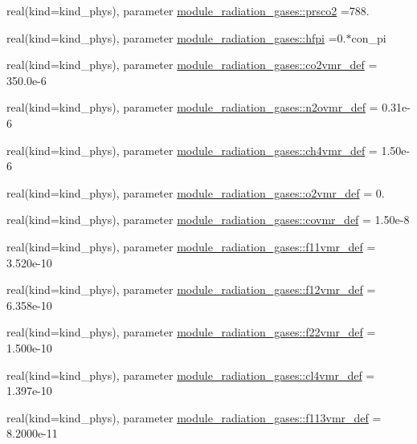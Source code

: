 \begin{DoxyCompactItemize}
\item 
real(kind=kind\+\_\+phys), parameter \hyperlink{namespacemodule__radiation__gases_ab09dc05b8a02e9a0b56991508b599708}{module\+\_\+radiation\+\_\+gases\+::prsco2} =788.
\item 
real(kind=kind\+\_\+phys), parameter \hyperlink{namespacemodule__radiation__gases_ab99c75954c59ed92a52de94ca6113f73}{module\+\_\+radiation\+\_\+gases\+::hfpi} =0.$\ast$con\+\_\+pi
\item 
real(kind=kind\+\_\+phys), parameter \hyperlink{namespacemodule__radiation__gases_a4fb5ca2e3bfaed7848d7602a22499e76}{module\+\_\+radiation\+\_\+gases\+::co2vmr\+\_\+def} = 350.\+0e-\/6
\item 
real(kind=kind\+\_\+phys), parameter \hyperlink{namespacemodule__radiation__gases_a858ad802efe755f8b4b5bde85996b6ae}{module\+\_\+radiation\+\_\+gases\+::n2ovmr\+\_\+def} = 0.\+31e-\/6
\item 
real(kind=kind\+\_\+phys), parameter \hyperlink{namespacemodule__radiation__gases_aad928d9e0064905a0b6e1eb8bb59bd23}{module\+\_\+radiation\+\_\+gases\+::ch4vmr\+\_\+def} = 1.\+50e-\/6
\item 
real(kind=kind\+\_\+phys), parameter \hyperlink{namespacemodule__radiation__gases_a910898e96b8afe92ebc82ce62ba682d8}{module\+\_\+radiation\+\_\+gases\+::o2vmr\+\_\+def} = 0.
\item 
real(kind=kind\+\_\+phys), parameter \hyperlink{namespacemodule__radiation__gases_a3554bdf03f8222d425bb6c946244cbb5}{module\+\_\+radiation\+\_\+gases\+::covmr\+\_\+def} = 1.\+50e-\/8
\item 
real(kind=kind\+\_\+phys), parameter \hyperlink{namespacemodule__radiation__gases_a23ae6bb6860bfefef0c281b7106f521e}{module\+\_\+radiation\+\_\+gases\+::f11vmr\+\_\+def} = 3.\+520e-\/10
\item 
real(kind=kind\+\_\+phys), parameter \hyperlink{namespacemodule__radiation__gases_a96d4f78070f30010626e0824b3421250}{module\+\_\+radiation\+\_\+gases\+::f12vmr\+\_\+def} = 6.\+358e-\/10
\item 
real(kind=kind\+\_\+phys), parameter \hyperlink{namespacemodule__radiation__gases_afd0018e96811ac64ef2abd8cab821eb5}{module\+\_\+radiation\+\_\+gases\+::f22vmr\+\_\+def} = 1.\+500e-\/10
\item 
real(kind=kind\+\_\+phys), parameter \hyperlink{namespacemodule__radiation__gases_a013f8faaee6df0c7c032e1786770c110}{module\+\_\+radiation\+\_\+gases\+::cl4vmr\+\_\+def} = 1.\+397e-\/10
\item 
real(kind=kind\+\_\+phys), parameter \hyperlink{namespacemodule__radiation__gases_a76ec88dc6284c48cfaae6cd05428b6dd}{module\+\_\+radiation\+\_\+gases\+::f113vmr\+\_\+def} = 8.\+2000e-\/11

\end{DoxyCompactItemize}
